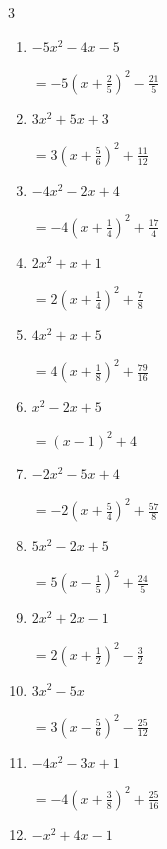 \begin{multicols}{3}
\begin{enumerate}
\columnbreak %

  \item $-5x^{2}-4x-5$

        $\displaystyle =-5\left( x+\frac{2}{5}\right)^{2}-\frac{21}{5}$

  \item $3x^{2}+5x+3$

        $\displaystyle =3\left( x+\frac{5}{6}\right)^{2}+\frac{11}{12}$

  \item $-4x^{2}-2x+4$

        $\displaystyle =-4\left( x+\frac{1}{4}\right)^{2}+\frac{17}{4}$

  \item $2x^{2}+x+1$

        $\displaystyle =2\left( x+\frac{1}{4}\right)^{2}+\frac{7}{8}$

  \item $4x^{2}+x+5$

        $\displaystyle =4\left( x+\frac{1}{8}\right)^{2}+\frac{79}{16}$

\columnbreak %

  \item $x^{2}-2x+5$

        $\displaystyle =\left( x-1\right)^{2}+4$

  \item $-2x^{2}-5x+4$

        $\displaystyle =-2\left( x+\frac{5}{4}\right)^{2}+\frac{57}{8}$

  \item $5x^{2}-2x+5$

        $\displaystyle =5\left( x-\frac{1}{5}\right)^{2}+\frac{24}{5}$

  \item $2x^{2}+2x-1$

        $\displaystyle =2\left( x+\frac{1}{2}\right)^{2}-\frac{3}{2}$

  \item $3x^{2}-5x$

        $\displaystyle =3\left( x-\frac{5}{6}\right)^{2}-\frac{25}{12}$

\columnbreak %

\resetques

  \item $-4x^{2}-3x+1$

        $\displaystyle =-4\left( x+\frac{3}{8}\right)^{2}+\frac{25}{16}$

  \item $-x^{2}+4x-1$


\end{enumerate}
\end{multicols}
